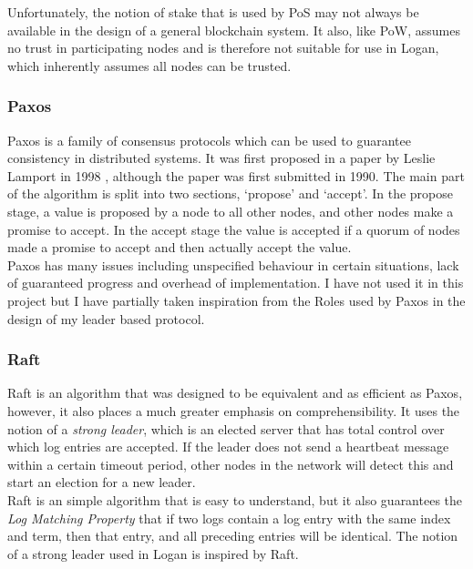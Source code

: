 \documentclass[12pt,a4paper,twoside,openright]{report}
\begin{document}
	Unfortunately, the notion of stake that is used by PoS may not always be available in the design of a general blockchain system. 
	It also, like PoW, assumes no trust in participating nodes and is therefore not suitable for use in Logan, which inherently assumes all nodes can be trusted.

	\subsubsection*{Paxos}
	Paxos is a family of consensus protocols which can be used to guarantee consistency in distributed systems. 
	It was first proposed in a paper by Leslie Lamport in 1998 \parencite{Paxos}, although the paper was first submitted in 1990.
	The main part of the algorithm is split into two sections, `propose' and `accept'.
	In the propose stage, a value is proposed by a node to all other nodes, and other nodes make a promise to accept.
	In the accept stage the value is accepted if a quorum of nodes made a promise to accept and then actually accept the value.\\

	Paxos has many issues including unspecified behaviour in certain situations, lack of guaranteed progress and overhead of implementation.
	I have not used it in this project but I have partially taken inspiration from the Roles used by Paxos in the design of my leader based protocol.

	\subsubsection*{Raft}
	Raft \parencite{Raft} is an algorithm that was designed to be equivalent and as efficient as Paxos, however, it also places a much greater emphasis on comprehensibility.
	It uses the notion of a \textit{strong leader}, which is an elected server that has total control over which log entries are accepted.
	If the leader does not send a heartbeat message within a certain timeout period, other nodes in the network will detect this and start an election for a new leader.\\
	
	Raft is an simple algorithm that is easy to understand, but it also guarantees the \textit{Log Matching Property} that if two logs contain a log entry with the same index and term, then that entry, and all preceding entries will be identical.
	The notion of a strong leader used in Logan is inspired by Raft.
\end{document}
